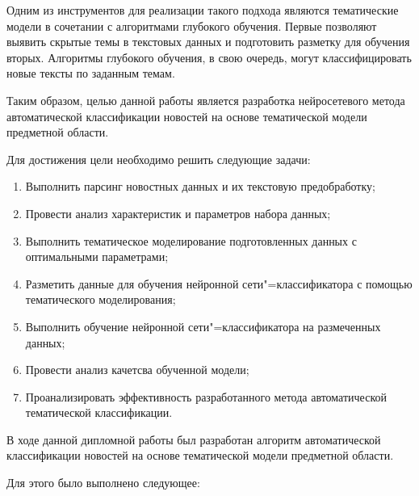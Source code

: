\documentclass[autoref]{SCWorks}
\begin{document}
Одним из инструментов для реализации такого подхода являются тематические
модели в сочетании с алгоритмами глубокого обучения. Первые позволяют выявить
скрытые темы в текстовых данных и подготовить разметку для обучения вторых.
Алгоритмы глубокого обучения, в свою очередь, могут классифицировать новые
тексты по заданным темам.

Таким образом, целью данной работы является разработка нейросетевого метода
автоматической классификации новостей на основе тематической модели предметной
области.

Для достижения цели необходимо решить следующие задачи:
\begin{enumerate}
    \item Выполнить парсинг новостных данных и их текстовую предобработку;
    \item Провести анализ характеристик и параметров набора данных;
    \item Выполнить тематическое моделирование подготовленных данных с
    оптимальными параметрами;
    \item Разметить данные для обучения нейронной сети"=классификатора с
    помощью тематического моделирования;
    \item Выполнить обучение нейронной сети"=классификатора на размеченных
    данных;
    \item Провести анализ качетсва обученной модели;
    \item Проанализировать эффективность разработанного метода автоматической
    тематической классификации.
\end{enumerate}

\conclusion
В ходе данной дипломной работы был разработан алгоритм автоматической
классификации новостей на основе тематической модели предметной области.

Для этого было выполнено следующее:
\end{document}
